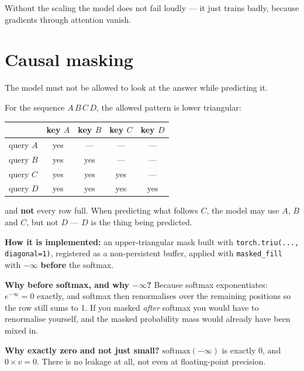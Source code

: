 \documentclass[11pt]{report}
\begin{document}
\begin{keypoint}
Without the scaling the model does not fail loudly --- it just trains badly,
because gradients through attention vanish.
\end{keypoint}

\section{Causal masking}

\begin{notebox}
The model must not be allowed to look at the answer while predicting it.
\end{notebox}

For the sequence $A\,B\,C\,D$, the allowed pattern is lower triangular:

\begin{center}\small
\begin{tabular}{l|cccc}
& \textbf{key }$A$ & \textbf{key }$B$ & \textbf{key }$C$ & \textbf{key }$D$ \\
\midrule
query $A$ & yes & --- & --- & --- \\
query $B$ & yes & yes & --- & --- \\
query $C$ & yes & yes & yes & --- \\
query $D$ & yes & yes & yes & yes \\
\end{tabular}
\end{center}

and \textbf{not} every row full. When predicting what follows $C$, the model may
use $A$, $B$ and $C$, but not $D$ --- $D$ is the thing being predicted.

\begin{deeper}
\textbf{How it is implemented:} an upper-triangular mask built with
\texttt{torch.triu(..., diagonal=1)}, registered as a non-persistent buffer,
applied with \texttt{masked\_fill} with $-\infty$ \textbf{before} the softmax.

\medskip
\textbf{Why before softmax, and why $-\infty$?} Because softmax exponentiates:
$e^{-\infty} = 0$ exactly, and softmax then renormalises over the remaining
positions so the row still sums to 1. If you masked \emph{after} softmax you
would have to renormalise yourself, and the masked probability mass would
already have been mixed in.

\medskip
\textbf{Why exactly zero and not just small?} $\mathrm{softmax}(-\infty)$ is
exactly 0, and $0 \times v = 0$. There is no leakage at all, not even at
floating-point precision.
\end{deeper}
\end{document}
